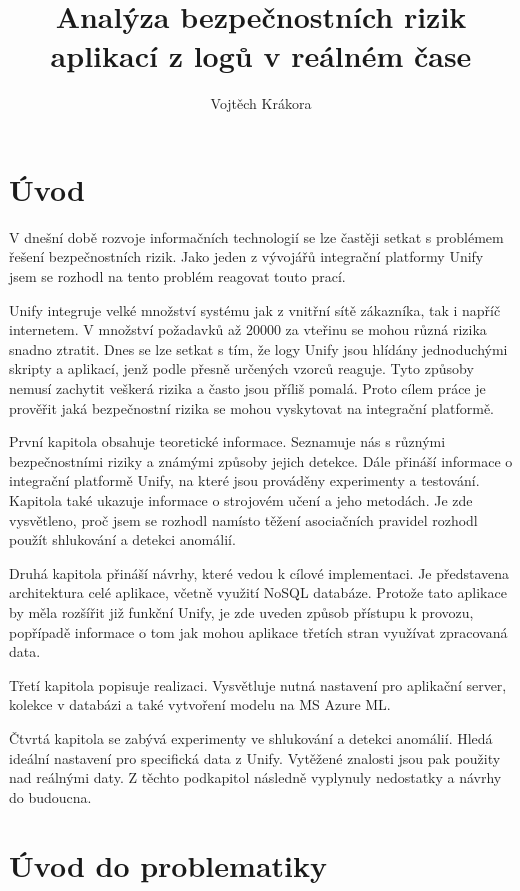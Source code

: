 \documentclass[thesis=M,czech]{FITthesis}[2012/10/20]
\title{Analýza bezpečnostních rizik aplikací z logů v reálném čase}
\author{Vojtěch Krákora} %
\begin{document}

\chapter{Úvod}
V dnešní době rozvoje informačních technologií se lze častěji setkat s problémem řešení bezpečnostních rizik. Jako jeden z vývojářů integrační platformy Unify jsem se rozhodl na tento problém reagovat touto prací. 

Unify integruje velké množství systému jak z vnitřní sítě zákazníka, tak i napříč internetem. V množství požadavků až 20000 za vteřinu se mohou různá rizika snadno ztratit. Dnes se lze setkat s tím, že logy Unify jsou hlídány jednoduchými skripty a aplikací, jenž podle přesně určených vzorců reaguje. Tyto způsoby nemusí zachytit veškerá rizika a často jsou příliš pomalá. Proto cílem práce je prověřit jaká bezpečnostní rizika se mohou vyskytovat na integrační platformě.

První kapitola obsahuje teoretické informace. Seznamuje nás s různými bezpečnostními riziky a známými způsoby jejich detekce. Dále přináší informace o integrační platformě Unify, na které jsou prováděny experimenty a testování. Kapitola také ukazuje informace o strojovém učení a jeho metodách. Je zde vysvětleno, proč jsem se rozhodl namísto těžení asociačních pravidel   rozhodl použít shlukování a detekci anomálií.

Druhá kapitola přináší návrhy, které vedou k cílové implementaci. Je představena architektura celé aplikace, včetně využití NoSQL databáze. Protože tato aplikace by měla rozšířit již funkční Unify, je zde uveden způsob přístupu k provozu, popřípadě informace o tom jak mohou aplikace třetích stran využívat zpracovaná data.

Třetí kapitola popisuje realizaci. Vysvětluje nutná nastavení pro aplikační server, kolekce v databázi a také vytvoření modelu na MS Azure ML.

Čtvrtá kapitola se zabývá experimenty ve shlukování a detekci anomálií. Hledá ideální nastavení pro specifická data z Unify. Vytěžené znalosti jsou pak použity nad reálnými daty. Z těchto podkapitol následně vyplynuly nedostatky a návrhy do budoucna.
  


\chapter{Úvod do problematiky}
	
\end{document}
